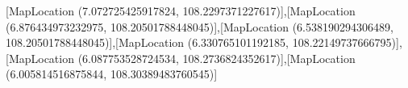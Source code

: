 [MapLocation (7.072725425917824, 108.2297371227617)],[MapLocation (6.876434973232975, 108.20501788448045)],[MapLocation (6.538190294306489, 108.20501788448045)],[MapLocation (6.330765101192185, 108.22149737666795)],[MapLocation (6.087753528724534, 108.2736824352617)],[MapLocation (6.005814516875844, 108.30389483760545)]